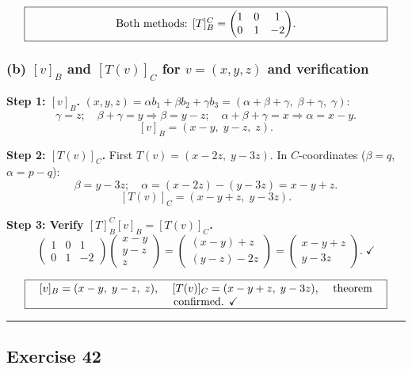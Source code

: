 \documentclass[a4paper,12pt]{article}
\begin{document}
\[
\fbox{\parbox{0.93\textwidth}{\centering
Both methods: $[T]_B^C = \begin{pmatrix} 1 & 0 & 1 \\ 0 & 1 & -2 \end{pmatrix}$.
}}
\]

\subsubsection*{(b) $[v]_B$ and $[T(v)]_C$ for $v = (x, y, z)$ and verification}

\textbf{Step 1: $[v]_B$.} $(x,y,z) = \alpha b_1 + \beta b_2 + \gamma b_3 = (\alpha + \beta + \gamma,\; \beta + \gamma,\; \gamma)$:
\[
\gamma = z; \quad \beta + \gamma = y \Rightarrow \beta = y - z; \quad \alpha + \beta + \gamma = x \Rightarrow \alpha = x - y.
\]
\[
[v]_B = (x - y,\; y - z,\; z).
\]

\textbf{Step 2: $[T(v)]_C$.} First $T(v) = (x - 2z,\; y - 3z)$. In $C$-coordinates ($\beta = q$, $\alpha = p - q$):
\[
\beta = y - 3z; \quad \alpha = (x - 2z) - (y - 3z) = x - y + z.
\]
\[
[T(v)]_C = (x - y + z,\; y - 3z).
\]

\textbf{Step 3: Verify $[T]_B^C [v]_B = [T(v)]_C$.}
\[
\begin{pmatrix} 1 & 0 & 1 \\ 0 & 1 & -2 \end{pmatrix}\begin{pmatrix} x - y \\ y - z \\ z \end{pmatrix}
= \begin{pmatrix} (x-y) + z \\ (y-z) - 2z \end{pmatrix}
= \begin{pmatrix} x - y + z \\ y - 3z \end{pmatrix}. \;\checkmark
\]

\[
\fbox{\parbox{0.93\textwidth}{\centering
$[v]_B = (x-y,\; y-z,\; z)$, \quad $[T(v)]_C = (x-y+z,\; y-3z)$, \quad theorem confirmed. \checkmark
}}
\]

\bigskip
\hrule
\bigskip

\subsection*{Exercise 42}
\end{document}
